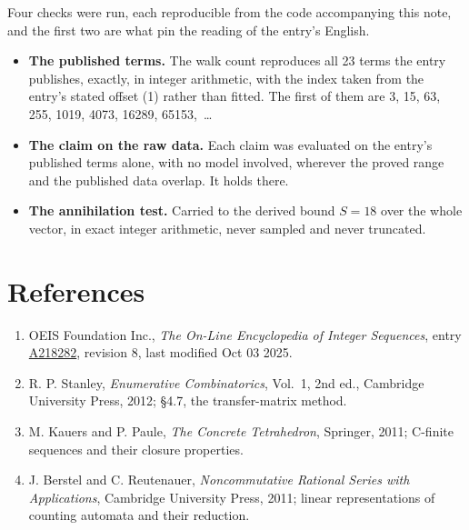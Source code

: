 \documentclass[11pt]{article}
\theoremstyle{definition}
\begin{document}
Four checks were run, each reproducible from the code accompanying this note, and the first two are what pin the reading of the entry's English.

\begin{itemize}

\item {\bfseries The published terms.} The walk count reproduces all 23 terms the entry publishes, exactly, in integer arithmetic, with the index taken from the entry's stated offset (1) rather than fitted. The first of them are 3, 15, 63, 255, 1019, 4073, 16289, 65153,~\dots

\item {\bfseries The claim on the raw data.} Each claim was evaluated on the entry's published terms alone, with no model involved, wherever the proved range and the published data overlap. It holds there.

\item {\bfseries The annihilation test.} Carried to the derived bound $S = 18$ over the whole vector, in exact integer arithmetic, never sampled and never truncated.

\end{itemize}

\section{References}

\begin{enumerate}

\item OEIS Foundation Inc., \emph{The On-Line Encyclopedia of Integer Sequences}, entry \href{https://oeis.org/A218282}{A218282}, revision 8, last modified Oct 03 2025.

\item R. P. Stanley, \emph{Enumerative Combinatorics}, Vol.~1, 2nd ed., Cambridge University Press, 2012; \S4.7, the transfer-matrix method.

\item M. Kauers and P. Paule, \emph{The Concrete Tetrahedron}, Springer, 2011; C-finite sequences and their closure properties.

\item J. Berstel and C. Reutenauer, \emph{Noncommutative Rational Series with Applications}, Cambridge University Press, 2011; linear representations of counting automata and their reduction.

\end{enumerate}
\end{document}
